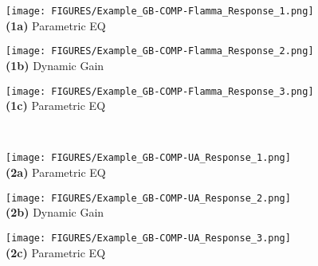 \begin{figure*}[t]
    \begin{minipage}[b]{.31\textwidth}
        \centering
        \texttt{[image: FIGURES/Example\_GB-COMP-Flamma\_Response\_1.png]}
        \\\textbf{(1a)} Parametric EQ
        \label{fig:ex_eqblock_response}
    \end{minipage}
    \begin{minipage}[b]{.36\textwidth}
        \centering
        \texttt{[image: FIGURES/Example\_GB-COMP-Flamma\_Response\_2.png]}
        \\\textbf{(1b)} Dynamic Gain
        \label{fig:ex_nonlinblock_response}
    \end{minipage}
    \begin{minipage}[b]{.32\textwidth}
        \centering
        \texttt{[image: FIGURES/Example\_GB-COMP-Flamma\_Response\_3.png]}
        \\\textbf{(1c)} Parametric EQ
        \label{fig:ex_dcblock_response}
    \end{minipage}\\
    
    \begin{minipage}[b]{.31\textwidth}
        \centering
        \texttt{[image: FIGURES/Example\_GB-COMP-UA\_Response\_1.png]}
        \\\textbf{(2a)} Parametric EQ
        \label{fig:ex_eqblock_response}
    \end{minipage}
    \begin{minipage}[b]{.36\textwidth}
        \centering
        \texttt{[image: FIGURES/Example\_GB-COMP-UA\_Response\_2.png]}
        \\\textbf{(2b)} Dynamic Gain
        \label{fig:ex_nonlinblock_response}
    \end{minipage}
    \begin{minipage}[b]{.32\textwidth}
        \centering
        \texttt{[image: FIGURES/Example\_GB-COMP-UA\_Response\_3.png]}
        \\\textbf{(2c)} Parametric EQ
        \label{fig:ex_dcblock_response}
    \end{minipage}\\


\end{figure*}
